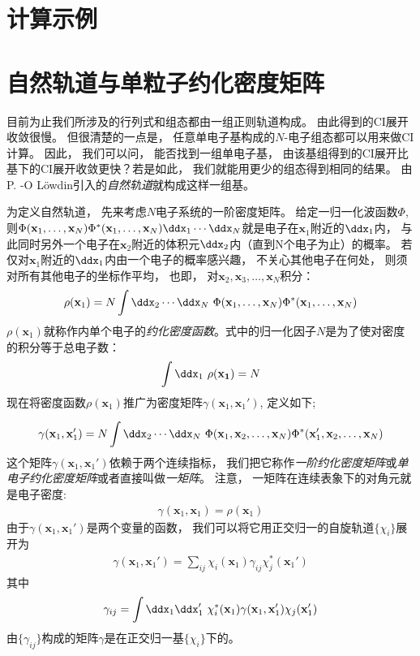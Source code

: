 \section{计算示例}\mbox{}
\label{sec4.3}
\section{自然轨道与单粒子约化密度矩阵}
\label{sec4.4}
目前为止我们所涉及的行列式和组态都由一组正则\hft 轨道构成。
由此得到的CI展开收敛很慢。
但很清楚的一点是，
任意单电子基构成的$N$-电子组态都可以用来做CI计算。
因此，
我们可以问，
能否找到一组单电子基，
由该基组得到的CI展开比\hft 基下的CI展开收敛更快？若是如此，
我们就能用更少的组态得到相同的结果。
由P.
-O L\"owdin引入的\emph{自然轨道}就构成这样一组基。


为定义自然轨道，
先来考虑$N$电子系统的一阶密度矩阵。
给定一归一化波函数$\Phi$, 
则$\Phi(\mathbf{x}_1,\ldots,\mathbf{x}_N)\Phi^*(\mathbf{x}_1,\ldots,\mathbf{x}_N)\ddx_1\cdots\ddx_N$就是电子在$\mathbf{x}_1$附近的$\ddx_1$内，
与此同时另外一个电子在$\mathbf{x}_2$附近的体积元$\ddx_2$内（直到N个电子为止）的概率。
若仅对$\mathbf{x}_1$附近的$\ddx_1$内由一个电子的概率感兴趣，
不关心其他电子在何处，
则须对所有其他电子的坐标作平均，
也即，
对$\mathbf{x}_2,\mathbf{x}_3,\ldots,\mathbf{x}_N$积分：
\begin{align}
\rho(\mathbf{x}_1) = N \int\ddx_2\cdots\ddx_N \,\, \Phi(\mathbf{x}_1,\ldots,\mathbf{x}_N)\Phi^*(\mathbf{x}_1,\ldots,\mathbf{x}_N)
\end{align}
$\rho(\mathbf{x}_1)$就称作内单个电子的\emph{约化密度函数}。式中的归一化因子$N$是为了使对密度的积分等于总电子数：
\begin{align}
\int\ddx_1\,\,\rho(\mathbf{x_1}) = N
\end{align}
现在将密度函数$\rho(\mathbf{x}_1)$推广为密度矩阵$\gamma(\mathbf{x}_1,\mathbf{x}_1')$, 
定义如下;

\begin{align}
\label{4.35}
\gamma(\mathbf{x}_1,\mathbf{x}_1') = N \int\ddx_2\cdots\ddx_N \,\, \Phi(\mathbf{x}_1,\mathbf{x}_2,\ldots,\mathbf{x}_N)\Phi^*(\mathbf{x}_1',\mathbf{x}_2,\ldots,\mathbf{x}_N)
\end{align}
这个矩阵$\gamma(\mathbf{x}_1,\mathbf{x}_1')$依赖于两个连续指标，
我们把它称作\emph{一阶约化密度矩阵}或\emph{单电子约化密度矩阵}或者直接叫做\emph{一矩阵}。
注意，
一矩阵在连续表象下的对角元就是电子密度:
\begin{align}
\gamma(\mathbf{x}_1,\mathbf{x}_1) = \rho(\mathbf{x}_1)
\end{align}
由于$\gamma(\mathbf{x}_1,\mathbf{x}_1')$是两个变量的函数，
我们可以将它用正交归一的\hft 自旋轨道$\{\chi_i\}$展开为
\begin{align}
\gamma(\mathbf{x}_1,\mathbf{x}_1') = \sum_{ij} \chi_i(\mathbf{x}_1) \gamma_{ij} \chi_j^*(\mathbf{x}_1')
\label{4.37}
\end{align}
其中
\begin{align}
\gamma_{ij} = \int\ddx_1\ddx_1'\,\,\chi_i^*(\mathbf{x}_1)\gamma(\mathbf{x}_1,\mathbf{x}_1')\chi_j(\mathbf{x}_1')
\end{align}
由$\{\gamma_{ij}\}$构成的矩阵$\gamma$是在正交归一基$\{\chi_i\}$下的。


